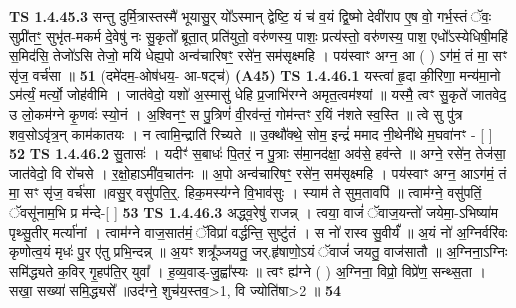 \documentclass[17pt]{extarticle}
\begin{document}
                                \textbf{ TS 1.4.45.3} \newline
                  सन्तु दुर्मि॒त्रास्तस्मै॑ भूयासु॒र् यो᳚ऽस्मान् द्वेष्टि॒ यं च॑ व॒यं द्वि॒ष्मो देवी॑राप ए॒ष वो॒ गर्भ॒स्तं ॅवः॒ सुप्री॑तꣳ॒॒ सुभृ॑त-मकर्म दे॒वेषु॑ नः सु॒कृतो᳚ ब्रूता॒त् प्रति॑युतो॒ वरु॑णस्य॒ पाशः॒ प्रत्य॑स्तो॒ वरु॑णस्य॒ पाश॒ एधो᳚ऽस्येधिषी॒महि॑ स॒मिद॑सि॒ तेजो॑ऽसि तेजो॒ मयि॑ धेह्य॒पो अन्व॑चारिषꣳ॒॒ रसे॑न॒ सम॑सृक्ष्महि । पय॑स्वाꣳ अग्न॒ आ ( ) ऽग॑मं॒ तं मा॒ सꣳ सृ॑ज॒ वर्च॑सा ॥ \textbf{  51} \newline
                  \newline
                      (दमे॑दम॒-ओष॑धय॒- आ-षट्च॑)  \textbf{(A45)} \newline \newline
                                        \textbf{ TS 1.4.46.1} \newline
                  यस्त्वा॑ हृ॒दा की॒रिणा॒ मन्य॑मा॒नो ऽम॑र्त्यं॒ मर्त्यो॒ जोह॑वीमि । जात॑वेदो॒ यशो॑ अ॒स्मासु॑ धेहि प्र॒जाभि॑रग्ने अमृत॒त्वम॑श्यां ॥ यस्मै॒ त्वꣳ सु॒कृते॑ जातवेद॒ उ लो॒कम॑ग्ने कृ॒णवः॑ स्यो॒नं । अ॒श्विनꣳ॒॒ स पु॒त्रिणं॑ वी॒रव॑न्तं॒ गोम॑न्तꣳ र॒यिं न॑शते स्व॒स्ति ॥ त्वे सु पु॑त्र शव॒सोऽवृ॑त्र॒न् काम॑कातयः । न त्वामि॒न्द्राति॑ रिच्यते ॥ उ॒क्थौ॑क्थे॒ सोम॒ इन्द्रं॑ ममाद नी॒थेनी॑थे म॒घवा॑नꣳ - [ ] \textbf{  52} \newline
                  \newline
                                \textbf{ TS 1.4.46.2} \newline
                  सु॒तासः॑ । यदीꣳ॑ स॒बाधः॑ पि॒तरं॒ न पु॒त्राः स॑मा॒नद॑क्षा॒ अव॑से॒ हव॑न्ते ॥ अग्ने॒ रसे॑न॒ तेज॑सा॒ जात॑वेदो॒ वि रो॑चसे । र॒क्षो॒हाऽमी॑व॒चात॑नः ॥ अ॒पो अन्व॑चारिषꣳ॒॒ रसे॑न॒ सम॑सृक्ष्महि । पय॑स्वाꣳ अग्न॒ आऽग॑मं॒ तं मा॒ सꣳ सृ॑ज॒ वर्च॑सा ॥वसु॒र् वसु॑पति॒र्॒. हिक॒मस्य॑ग्ने वि॒भाव॑सुः । स्याम॑ ते सुम॒तावपि॑ ॥ त्वाम॑ग्ने॒ वसु॑पतिं॒ ॅवसू॑नाम॒भि प्र म॑न्दे-[ ] \textbf{  53} \newline
                  \newline
                                \textbf{ TS 1.4.46.3} \newline
                  अद्ध्व॒रेषु॑ राजन्न्  । त्वया॒ वाजं॑ ॅवाज॒यन्तो॑ जयेमा॒-ऽभिष्या॑म पृथ्सु॒तीर् मर्त्या॑नां । त्वाम॑ग्ने वाज॒सात॑मं॒ ॅविप्रा॑ वर्द्धन्ति॒ सुष्टु॑तं । स नो॑ रास्व सु॒वीर्यं᳚ ॥ अ॒यं नो॑ अ॒ग्निर्वरि॑वः कृणोत्व॒यं मृधः॑ पु॒र ए॑तु प्रभि॒न्दन्न्  ॥ अ॒यꣳ शत्रू᳚ञ्जयतु॒ जर्.हृ॑षाणो॒ऽयं ॅवाजं॑ जयतु॒ वाज॑सातौ ॥ अ॒ग्निना॒ऽग्निः समि॑द्ध्यते क॒विर् गृ॒हप॑ति॒र् युवा᳚ । ह॒व्य॒वाड्-जु॒ह्वा᳚स्यः ॥ त्वꣳ ह्य॑ग्ने ( ) अ॒ग्निना॒ विप्रो॒ विप्रे॑ण॒ सन्थ्स॒ता । सखा॒ सख्या॑ समि॒द्ध्यसे᳚ ॥उद॑ग्ने॒ शुच॑य॒स्तव॒>1, वि ज्योति॑षा>2 ॥ \textbf{  54} \newline
\end{document}

